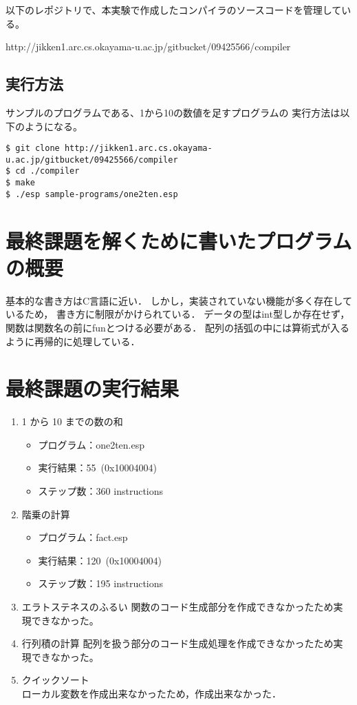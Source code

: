 \documentclass[11pt,a4j]{jarticle}
\begin{document}
以下のレポジトリで、本実験で作成したコンパイラのソースコードを管理している。

http://jikken1.arc.cs.okayama-u.ac.jp/gitbucket/09425566/compiler


\subsection{実行方法}

サンプルのプログラムである、1から10の数値を足すプログラムの
実行方法は以下のようになる。

\begin{verbatim}
$ git clone http://jikken1.arc.cs.okayama-u.ac.jp/gitbucket/09425566/compiler
$ cd ./compiler
$ make 
$ ./esp sample-programs/one2ten.esp
\end{verbatim}



\section{最終課題を解くために書いたプログラムの概要}

基本的な書き方はC言語に近い．
しかし，実装されていない機能が多く存在しているため，
書き方に制限がかけられている．
データの型はint型しか存在せず，関数は関数名の前にfunとつける必要がある．
配列の括弧の中には算術式が入るように再帰的に処理している．



\section{最終課題の実行結果} %

\begin{enumerate}
\item {1 から 10 までの数の和 }
  \begin{itemize}
  \item
    プログラム：one2ten.esp
  \item
    実行結果：55~(0x10004004)
  \item
    ステップ数：360 instructions 
  \end{itemize}
\item {階乗の計算}
  \begin{itemize}
  \item
    プログラム：fact.esp
  \item
    実行結果：120~(0x10004004) %
  \item
    ステップ数：195 instructions %
  \end{itemize}
\item {エラトステネスのふるい}
  関数のコード生成部分を作成できなかったため実現できなかった。
\item {行列積の計算}
  配列を扱う部分のコード生成処理を作成できなかったため実現できなかった。
\item {クイックソート}\\
  ローカル変数を作成出来なかったため，作成出来なかった．
\end{enumerate}
\end{document}

